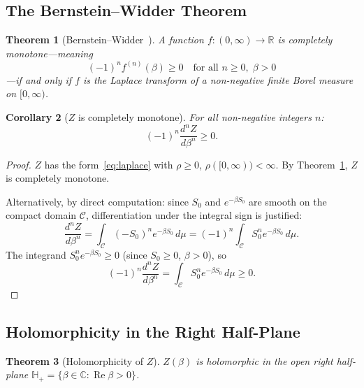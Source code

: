 \documentclass[12pt,a4paper]{article}
\theoremstyle{plain}
\newtheorem{theorem}{Theorem}[section]
\newtheorem{corollary}[theorem]{Corollary}
\theoremstyle{definition}
\theoremstyle{remark}
\begin{document}
\subsection{The Bernstein--Widder Theorem}\label{sec:BW}

\begin{theorem}[Bernstein--Widder~\cite{Bernstein1929,Widder1941}]\label{thm:BW}
A function $f:(0,\infty)\to\mathbb{R}$ is completely monotone---meaning
\begin{equation}\label{eq:cmdef}
(-1)^n f^{(n)}(\beta) \geq 0 \quad\text{for all }n\geq 0,\;\beta>0
\end{equation}
---if and only if $f$ is the Laplace transform of a non-negative finite Borel measure on $[0,\infty)$.
\end{theorem}

\begin{corollary}[$Z$ is completely monotone]\label{cor:cm}
For all non-negative integers $n$:
\begin{equation}\label{eq:cm}
(-1)^n\frac{d^n Z}{d\beta^n} \geq 0.
\end{equation}
\end{corollary}

\begin{proof}
$Z$ has the form~\eqref{eq:laplace} with $\rho\geq 0$, $\rho([0,\infty))<\infty$. By Theorem~\ref{thm:BW}, $Z$ is completely monotone.

Alternatively, by direct computation: since $S_0$ and $e^{-\beta S_0}$ are smooth on the compact domain $\mathcal{C}$, differentiation under the integral sign is justified:
\begin{equation}\label{eq:cm_direct}
\frac{d^n Z}{d\beta^n} = \int_{\mathcal{C}} (-S_0)^n e^{-\beta S_0}\,d\mu = (-1)^n\int_{\mathcal{C}} S_0^n e^{-\beta S_0}\,d\mu.
\end{equation}
The integrand $S_0^n e^{-\beta S_0}\geq 0$ (since $S_0\geq 0$, $\beta>0$), so
\begin{equation}\label{eq:cm_result}
(-1)^n\frac{d^n Z}{d\beta^n} = \int_{\mathcal{C}} S_0^n e^{-\beta S_0}\,d\mu \geq 0.
\end{equation}
\end{proof}

\subsection{Holomorphicity in the Right Half-Plane}\label{sec:holo}

\begin{theorem}[Holomorphicity of $Z$]\label{thm:holo}
$Z(\beta)$ is holomorphic in the open right half-plane $\mathbb{H}_+=\{\beta\in\mathbb{C}:\operatorname{Re}\beta>0\}$.
\end{theorem}
\end{document}
